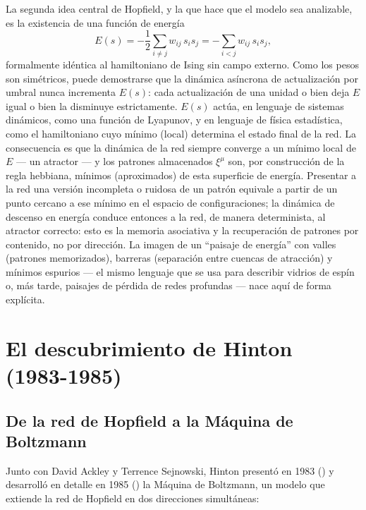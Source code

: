 \documentclass[12pt]{article}
\begin{document}
La segunda idea central de Hopfield, y la que hace que el modelo sea analizable, es la existencia de una función de energía
\begin{equation}
E(s) = -\frac{1}{2}\sum_{i\neq j} w_{ij}\, s_i s_j = -\sum_{i<j} w_{ij}\, s_i s_j ,
\label{eq:hopfield-energy}
\end{equation}
formalmente idéntica al hamiltoniano de Ising sin campo externo. Como los pesos son simétricos, puede demostrarse que la dinámica asíncrona de actualización por umbral nunca incrementa $E(s)$: cada actualización de una unidad o bien deja $E$ igual o bien la disminuye estrictamente. $E(s)$ actúa, en lenguaje de sistemas dinámicos, como una función de Lyapunov, y en lenguaje de física estadística, como el hamiltoniano cuyo mínimo (local) determina el estado final de la red. La consecuencia es que la dinámica de la red siempre converge a un mínimo local de $E$ --- un atractor --- y los patrones almacenados $\xi^\mu$ son, por construcción de la regla hebbiana, mínimos (aproximados) de esta superficie de energía. Presentar a la red una versión incompleta o ruidosa de un patrón equivale a partir de un punto cercano a ese mínimo en el espacio de configuraciones; la dinámica de descenso en energía conduce entonces a la red, de manera determinista, al atractor correcto: esto es la memoria asociativa y la recuperación de patrones por contenido, no por dirección. La imagen de un ``paisaje de energía'' con valles (patrones memorizados), barreras (separación entre cuencas de atracción) y mínimos espurios --- el mismo lenguaje que se usa para describir vidrios de espín o, más tarde, paisajes de pérdida de redes profundas --- nace aquí de forma explícita.

\section{El descubrimiento de Hinton (1983-1985)}

\subsection{De la red de Hopfield a la Máquina de Boltzmann}

Junto con David Ackley y Terrence Sejnowski, Hinton presentó en 1983 (\cite{fahlman1983}) y desarrolló en detalle en 1985 (\cite{ackley1985}) la Máquina de Boltzmann, un modelo que extiende la red de Hopfield en dos direcciones simultáneas:
\end{document}
